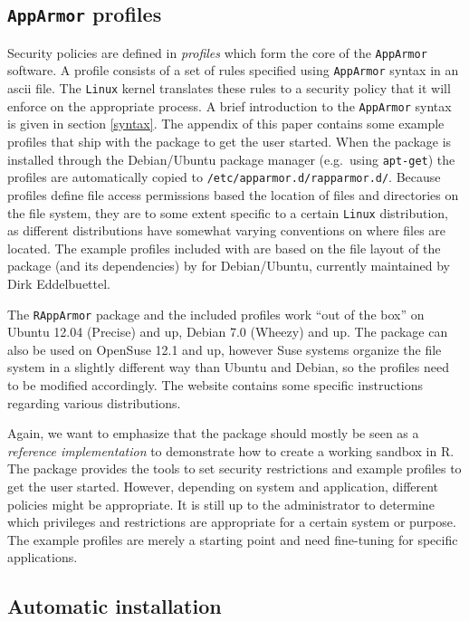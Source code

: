 \documentclass{jss}
\newcommand{\R}{\textsf{R}\xspace}
\newcommand{\AppArmor}{\texttt{AppArmor}\xspace}
\newcommand{\RAppArmor}{\pkg{RAppArmor}\xspace}
\newcommand{\Linux}{\texttt{Linux}\xspace}
\begin{document}
\subsection[AppArmor profiles]{\AppArmor profiles}

Security policies are defined in \emph{profiles} which form the core of the
\AppArmor software. A profile consists of a set of rules specified using
\AppArmor syntax in an ascii file. The \Linux kernel translates these rules to
a security policy that it will enforce on the appropriate process. A brief
introduction to the \AppArmor syntax is given in section \ref{syntax}. The
appendix of this paper contains some example profiles that ship with the
\RAppArmor package to get the user started. When the package is installed
through the Debian/Ubuntu package manager (e.g.\ using \texttt{apt-get}) the
profiles are automatically copied to \texttt{/etc/apparmor.d/rapparmor.d/}.
Because profiles define file access permissions based the location of files and
directories on the file system, they are to some extent specific to a certain
\Linux distribution, as different distributions have somewhat varying
conventions on where files are located. The example profiles included with
\RAppArmor are based on the file layout of the  package (and its
dependencies) by \cite{batesusing} for Debian/Ubuntu, currently maintained by
Dirk Eddelbuettel.

The \texttt{RAppArmor} package and the included profiles work ``out of the box''
on Ubuntu 12.04 (Precise) and up, Debian 7.0 (Wheezy) and up. The package can
also be used on OpenSuse 12.1 and up, however Suse systems organize the file
system in a slightly different way than Ubuntu and Debian, so the profiles need
to be modified accordingly. The \RAppArmor website contains some specific
instructions regarding various distributions.


Again, we want to emphasize that the package should mostly be seen as a
\emph{reference implementation} to demonstrate how to create a working sandbox
in \R. The \RAppArmor package provides the tools to set security restrictions
and example profiles to get the user started. However, depending on system and
application, different policies might be appropriate. It is still up to the
administrator to determine which privileges and restrictions are appropriate
for a certain system or purpose. The example profiles are merely a starting
point and need fine-tuning for specific applications.

\subsection{Automatic installation}
\end{document}
